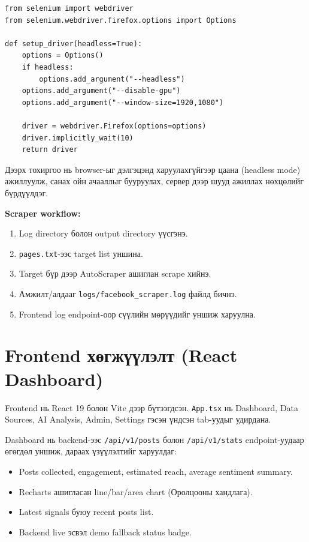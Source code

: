 \begin{verbatim}
from selenium import webdriver
from selenium.webdriver.firefox.options import Options

def setup_driver(headless=True):
    options = Options()
    if headless:
        options.add_argument("--headless")
    options.add_argument("--disable-gpu")
    options.add_argument("--window-size=1920,1080")
    
    driver = webdriver.Firefox(options=options)
    driver.implicitly_wait(10)
    return driver
\end{verbatim}

Дээрх тохиргоо нь browser-ыг дэлгэцэнд харуулахгүйгээр цаана (headless mode) ажиллуулж, санах ойн ачааллыг бууруулах, сервер дээр шууд ажиллах нөхцөлийг бүрдүүлдэг.

\textbf{Scraper workflow:}
\begin{enumerate}
    \item Log directory болон output directory үүсгэнэ.
    \item \texttt{pages.txt}-ээс target list уншина.
    \item Target бүр дээр AutoScraper ашиглан scrape хийнэ.
    \item Амжилт/алдааг \texttt{logs/facebook\_scraper.log} файлд бичнэ.
    \item Frontend log endpoint-оор сүүлийн мөрүүдийг уншиж харуулна.
\end{enumerate}

\section{Frontend хөгжүүлэлт (React Dashboard)}

Frontend нь React 19 болон Vite дээр бүтээгдсэн. \texttt{App.tsx} нь Dashboard, Data Sources, AI Analysis, Admin, Settings гэсэн үндсэн tab-уудыг удирдана.

Dashboard нь backend-ээс \texttt{/api/v1/posts} болон \texttt{/api/v1/stats} endpoint-уудаар өгөгдөл уншиж, дараах үзүүлэлтийг харуулдаг:
\begin{itemize}
    \item Posts collected, engagement, estimated reach, average sentiment summary.
    \item Recharts ашигласан line/bar/area chart (Оролцооны хандлага).
    \item Latest signals буюу recent posts list.
    \item Backend live эсвэл demo fallback status badge.
\end{itemize}

